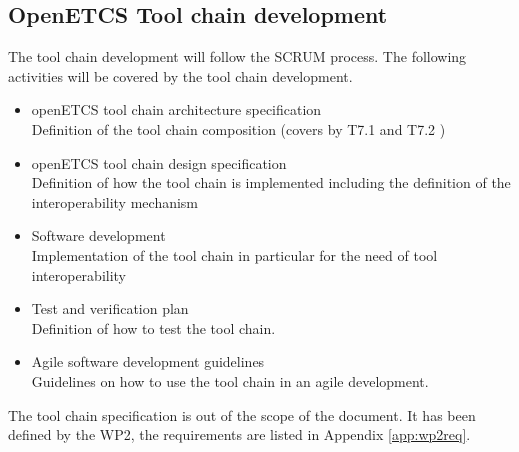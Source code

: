\subsection{OpenETCS Tool chain development}
The tool chain development will follow the SCRUM process.
The following activities will be covered  by the tool chain development.
\begin{itemize}
\item openETCS tool chain architecture specification\\
Definition of the tool chain composition (covers by T7.1 \cite{D7.1}
and T7.2 \cite{D7.2})
\item openETCS tool chain design specification \\
Definition of how the tool chain is implemented including the
definition of the interoperability mechanism
\item Software development\\
Implementation of the tool chain in particular for the need of tool interoperability
\item Test and verification plan\\
Definition of how to test the tool chain.
\item Agile software development guidelines\\
Guidelines on how to use the tool chain in an agile development.
\end{itemize}

The tool chain specification is out of the scope of the document. It
has been defined by the WP2, the requirements are listed in Appendix \ref{app:wp2req}.
 	

